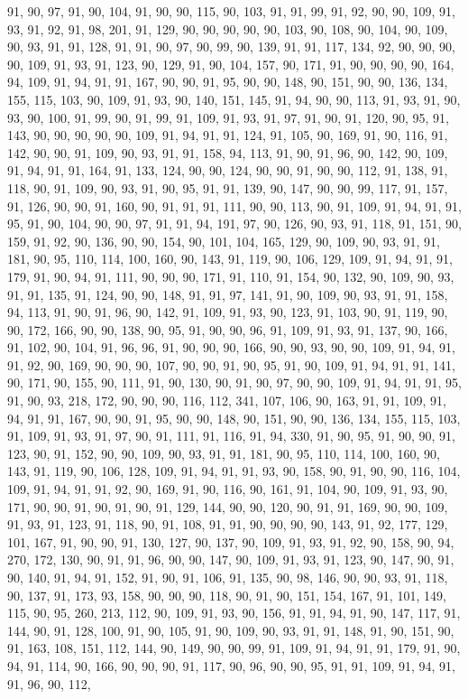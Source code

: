 \begin{sloppypar}
91, 90, 97, 91, 90, 104, 91, 90, 90, 115, 90, 103, 91, 91, 99, 91, 92, 90, 90, 109, 91, 93, 91, 92, 91, 98, 201, 91, 129, 90, 90, 90, 90, 90, 103, 90, 108, 90, 104, 90, 109, 90, 93, 91, 91, 128, 91, 91, 90, 97, 90, 99, 90, 139, 91, 91, 117, 134, 92, 90, 90, 90, 90, 109, 91, 93, 91, 123, 90, 129, 91, 90, 104, 157, 90, 171, 91, 90, 90, 90, 90, 164, 94, 109, 91, 94, 91, 91, 167, 90, 90, 91, 95, 90, 90, 148, 90, 151, 90, 90, 136, 134, 155, 115, 103, 90, 109, 91, 93, 90, 140, 151, 145, 91, 94, 90, 90, 113, 91, 93, 91, 90, 93, 90, 100, 91, 99, 90, 91, 99, 91, 109, 91, 93, 91, 97, 91, 90, 91, 120, 90, 95, 91, 143, 90, 90, 90, 90, 90, 109, 91, 94, 91, 91, 124, 91, 105, 90, 169, 91, 90, 116, 91, 142, 90, 90, 91, 109, 90, 93, 91, 91, 158, 94, 113, 91, 90, 91, 96, 90, 142, 90, 109, 91, 94, 91, 91, 164, 91, 133, 124, 90, 90, 124, 90, 90, 91, 90, 90, 112, 91, 138, 91, 118, 90, 91, 109, 90, 93, 91, 90, 95, 91, 91, 139, 90, 147, 90, 90, 99, 117, 91, 157, 91, 126, 90, 90, 91, 160, 90, 91, 91, 91, 111, 90, 90, 113, 90, 91, 109, 91, 94, 91, 91, 95, 91, 90, 104, 90, 90, 97, 91, 91, 94, 191, 97, 90, 126, 90, 93, 91, 118, 91, 151, 90, 159, 91, 92, 90, 136, 90, 90, 154, 90, 101, 104, 165, 129, 90, 109, 90, 93, 91, 91, 181, 90, 95, 110, 114, 100, 160, 90, 143, 91, 119, 90, 106, 129, 109, 91, 94, 91, 91, 179, 91, 90, 94, 91, 111, 90, 90, 90, 171, 91, 110, 91, 154, 90, 132, 90, 109, 90, 93, 91, 91, 135, 91, 124, 90, 90, 148, 91, 91, 97, 141, 91, 90, 109, 90, 93, 91, 91, 158, 94, 113, 91, 90, 91, 96, 90, 142, 91, 109, 91, 93, 90, 123, 91, 103, 90, 91, 119, 90, 90, 172, 166, 90, 90, 138, 90, 95, 91, 90, 90, 96, 91, 109, 91, 93, 91, 137, 90, 166, 91, 102, 90, 104, 91, 96, 96, 91, 90, 90, 90, 166, 90, 90, 93, 90, 90, 109, 91, 94, 91, 91, 92, 90, 169, 90, 90, 90, 107, 90, 90, 91, 90, 95, 91, 90, 109, 91, 94, 91, 91, 141, 90, 171, 90, 155, 90, 111, 91, 90, 130, 90, 91, 90, 97, 90, 90, 109, 91, 94, 91, 91, 95, 91, 90, 93, 218, 172, 90, 90, 90, 116, 112, 341, 107, 106, 90, 163, 91, 91, 109, 91, 94, 91, 91, 167, 90, 90, 91, 95, 90, 90, 148, 90, 151, 90, 90, 136, 134, 155, 115, 103, 91, 109, 91, 93, 91, 97, 90, 91, 111, 91, 116, 91, 94, 330, 91, 90, 95, 91, 90, 90, 91, 123, 90, 91, 152, 90, 90, 109, 90, 93, 91, 91, 181, 90, 95, 110, 114, 100, 160, 90, 143, 91, 119, 90, 106, 128, 109, 91, 94, 91, 91, 93, 90, 158, 90, 91, 90, 90, 116, 104, 109, 91, 94, 91, 91, 92, 90, 169, 91, 90, 116, 90, 161, 91, 104, 90, 109, 91, 93, 90, 171, 90, 90, 91, 90, 91, 90, 91, 129, 144, 90, 90, 120, 90, 91, 91, 169, 90, 90, 109, 91, 93, 91, 123, 91, 118, 90, 91, 108, 91, 91, 90, 90, 90, 90, 143, 91, 92, 177, 129, 101, 167, 91, 90, 90, 91, 130, 127, 90, 137, 90, 109, 91, 93, 91, 92, 90, 158, 90, 94, 270, 172, 130, 90, 91, 91, 96, 90, 90, 147, 90, 109, 91, 93, 91, 123, 90, 147, 90, 91, 90, 140, 91, 94, 91, 152, 91, 90, 91, 106, 91, 135, 90, 98, 146, 90, 90, 93, 91, 118, 90, 137, 91, 173, 93, 158, 90, 90, 90, 118, 90, 91, 90, 151, 154, 167, 91, 101, 149, 115, 90, 95, 260, 213, 112, 90, 109, 91, 93, 90, 156, 91, 91, 94, 91, 90, 147, 117, 91, 144, 90, 91, 128, 100, 91, 90, 105, 91, 90, 109, 90, 93, 91, 91, 148, 91, 90, 151, 90, 91, 163, 108, 151, 112, 144, 90, 149, 90, 90, 99, 91, 109, 91, 94, 91, 91, 179, 91, 90, 94, 91, 114, 90, 166, 90, 90, 90, 91, 117, 90, 96, 90, 90, 95, 91, 91, 109, 91, 94, 91, 91, 96, 90, 112, 
\end{sloppypar}
